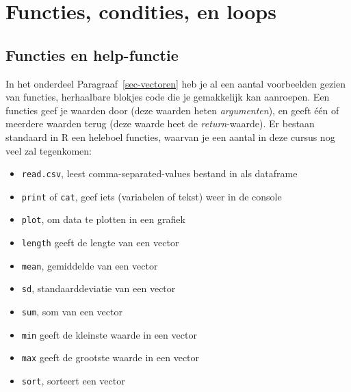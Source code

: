 \documentclass[
  b5paper,
  DIV=11,
  numbers=noendperiod]{scrreprt}
\newenvironment{Shaded}{\begin{snugshade}}{\end{snugshade}}
\newcommand{\CommentTok}[1]{\textcolor[rgb]{0.37,0.37,0.37}{#1}}
\newcommand{\DecValTok}[1]{\textcolor[rgb]{0.68,0.00,0.00}{#1}}
\newcommand{\FunctionTok}[1]{\textcolor[rgb]{0.28,0.35,0.67}{#1}}
\newcommand{\NormalTok}[1]{\textcolor[rgb]{0.00,0.23,0.31}{#1}}
\newcommand{\OtherTok}[1]{\textcolor[rgb]{0.00,0.23,0.31}{#1}}
\newcommand{\SpecialCharTok}[1]{\textcolor[rgb]{0.37,0.37,0.37}{#1}}
\newcommand{\StringTok}[1]{\textcolor[rgb]{0.13,0.47,0.30}{#1}}
\providecommand{\tightlist}{%
  \setlength{\itemsep}{0pt}\setlength{\parskip}{0pt}}\usepackage{longtable,booktabs,array}
\theoremstyle{definition}
\theoremstyle{remark}
\begin{document}
\begin{Shaded}
\end{Shaded}

\chapter{Functies, condities, en
loops}\label{functies-condities-en-loops}

\section{Functies en help-functie}\label{sec-functies}

In het onderdeel Paragraaf~\ref{sec-vectoren} heb je al een aantal
voorbeelden gezien van functies, herhaalbare blokjes code die je
gemakkelijk kan aanroepen. Een functies geef je waarden door (deze
waarden heten \emph{argumenten}), en geeft één of meerdere waarden terug
(deze waarde heet de \emph{return}-waarde). Er bestaan standaard in R
een heleboel functies, waarvan je een aantal in deze cursus nog veel zal
tegenkomen:

\begin{itemize}
\tightlist
\item
  \texttt{read.csv}, leest comma-separated-values bestand in als
  dataframe
\item
  \texttt{print} of \texttt{cat}, geef iets (variabelen of tekst) weer
  in de console
\item
  \texttt{plot}, om data te plotten in een grafiek
\item
  \texttt{length} geeft de lengte van een vector
\item
  \texttt{mean}, gemiddelde van een vector
\item
  \texttt{sd}, standaarddeviatie van een vector
\item
  \texttt{sum}, som van een vector
\item
  \texttt{min} geeft de kleinste waarde in een vector
\item
  \texttt{max} geeft de grootste waarde in een vector
\item
  \texttt{sort}, sorteert een vector
\end{itemize}
\end{document}
